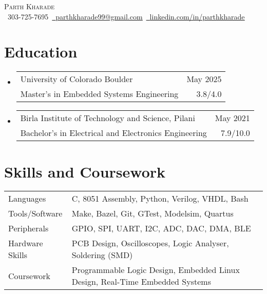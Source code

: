 \documentclass[11pt]{article}
\makeatletter
\newcommand{\resumeSubheadingEdu}[4]{
  \vspace{-2pt}\item
    \begin{tabular*}{1.0\textwidth}[t]{l@{\extracolsep{\fill}}r}
       {\large #1}&{\large #2} \\
       {#3} &{ #4} \\
    \end{tabular*}\vspace{-1pt}
}
\newcommand{\resumeSubHeadingListStart}{\begin{itemize}[leftmargin=0.0in, label={}]}
\newcommand{\resumeSubHeadingListEnd}{\end{itemize}}
\makeatother
\begin{document}
\setlength{\footskip}{4pt}
\begin{center}
  {\huge \scshape Parth Kharade} \\ \vspace{1pt}
  \small \raisebox{-0.1\height}\faPhone\ 303-725-7695{\hspace{0.1cm}}~\href{mailto:parthkharade99@gmail.com}{\raisebox{-0.2\height}\faEnvelope\ \underline{parthkharade99@gmail.com}}~{\hspace{0.1cm}}\href{https://www.linkedin.com/in/parth-k-081287184/}{\raisebox{-0.2\height}\faLinkedin\ \underline{linkedin.com/in/parthkharade}}
  \vspace{-10pt}
\end{center}



\section {Education}
\resumeSubHeadingListStart
\resumeSubheadingEdu
{University of Colorado Boulder}{May 2025}
{Master's in Embedded Systems Engineering}{3.8/4.0}
\vspace{-0.1in}
\resumeSubheadingEdu
{Birla Institute of Technology and Science, Pilani}{May 2021}
{Bachelor's in Electrical and Electronics Engineering}{7.9/10.0}
\resumeSubHeadingListEnd
\vspace{-16pt}
\section{Skills and Coursework}
\vspace{-4mm}
\begin{table}[!htb]
  \begin{tabular} { m{3.1cm} | m{15cm} }
    {Languages}           & {\: C, 8051 Assembly, Python, Verilog, VHDL, Bash}        \\
    {Tools/Software}      & {\: Make, Bazel, Git, GTest, Modelsim, Quartus}               \\
    {Peripherals}         & {\: GPIO, SPI, UART, I2C, ADC, DAC, DMA, BLE}                                          \\
    {Hardware Skills}     & {\: PCB Design, Oscilloscopes, Logic Analyser, Soldering (SMD)}\\
    {Coursework}          & {\: Programmable Logic Design, Embedded Linux Design, Real-Time Embedded Systems}                \\
  \end{tabular}
\end{table}
\vspace{-16pt}
\end{document}
